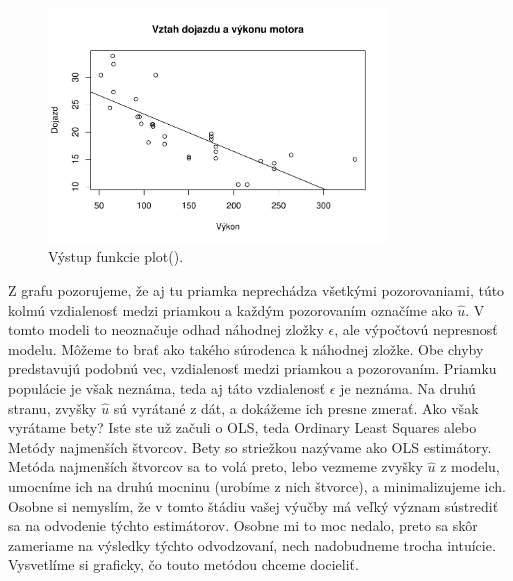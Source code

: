 \begin{figure}
\begin{center}
\includegraphics[width=0.8\textwidth,height=\textheight]{test_files/figure-latex/unnamed-chunk-41-1.pdf}
\caption{Výstup funkcie plot().}
\end{center}
\end{figure}

Z grafu pozorujeme, že aj tu priamka neprechádza všetkými pozorovaniami,
túto kolmú vzdialenosť medzi priamkou a každým pozorovaním označíme ako
\(\hat{u}\). V tomto modeli to neoznačuje odhad náhodnej zložky
\(\epsilon\), ale výpočtovú nepresnosť modelu. Môžeme to brať ako takého
súrodenca k náhodnej zložke. Obe chyby predstavujú podobnú vec,
vzdialenosť medzi priamkou a pozorovaním. Priamku populácie je však
neznáma, teda aj táto vzdialenosť \(\epsilon\) je neznáma. Na druhú
stranu, zvyšky \(\hat{u}\) sú vyrátané z dát, a dokážeme ich presne
zmerať. Ako však vyrátame bety? Iste ste už začuli o OLS, teda Ordinary
Least Squares alebo Metódy najmenších štvorcov. Bety so striežkou
nazývame ako OLS estimátory. Metóda najmenších štvorcov sa to volá
preto, lebo vezmeme zvyšky \(\hat{u}\) z modelu, umocníme ich na druhú
mocninu (urobíme z nich štvorce), a minimalizujeme ich. Osobne si
nemyslím, že v tomto štádiu vašej výučby má veľký význam sústrediť sa na
odvodenie týchto estimátorov. Osobne mi to moc nedalo, preto sa skôr
zameriame na výsledky týchto odvodzovaní, nech nadobudneme trocha
intuície. Vysvetlíme si graficky, čo touto metódou chceme docieliť.

